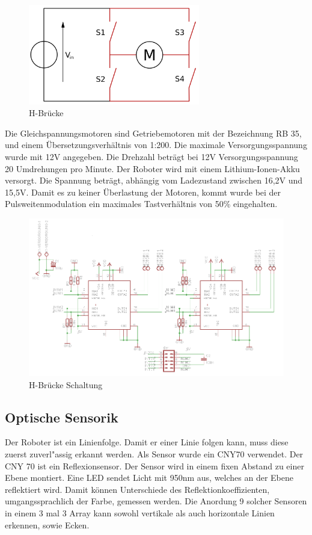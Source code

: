 \documentclass[a4paper,bibtotoc,oneside]{scrbook}
\begin{document}
\begin{figure}[htbp]
\centering
\includegraphics[width=75mm]{img/hbridge.png}
\caption[H-Brücke]{H-Brücke}\label{hbridge}
\end{figure}

Die Gleichspannungsmotoren sind Getriebemotoren mit der Bezeichnung RB 35, und einem Übersetzungsverhältnis von 1:200. Die maximale Versorgungsspannung wurde mit 12V angegeben. Die Drehzahl beträgt bei 12V Versorgungsspannung 20 Umdrehungen pro Minute.
Der Roboter wird mit einem Lithium-Ionen-Akku versorgt. Die Spannung beträgt, abhängig vom Ladezustand zwischen 16,2V und 15,5V. Damit es zu keiner Überlastung der Motoren, kommt wurde bei der Pulsweitenmodulation ein maximales Tastverhältnis von 50\% eingehalten.

\begin{figure}[htbp]
\centering
\includegraphics[width=150mm]{img/HBrucke.png}
\caption[H-Brücke Schaltung]{H-Brücke Schaltung}\label{hbridge2}
\end{figure}


\subsection{Optische Sensorik}\thispagestyle{empty}
Der Roboter ist ein Linienfolge. Damit er einer Linie folgen kann, muss diese zuerst zuverl"assig erkannt werden. 
Als Sensor wurde ein CNY70 verwendet. Der CNY 70 ist ein Reflexionsensor. Der Sensor wird in einem fixen Abstand zu einer Ebene montiert. Eine LED sendet Licht mit 950nm aus, welches an der Ebene reflektiert wird. Damit können Unterschiede des Reflektionkoeffizienten, umgangssprachlich der Farbe, gemessen werden. Die Anordung 9 solcher Sensoren in einem 3 mal 3 Array kann sowohl vertikale als auch horizontale Linien erkennen, sowie Ecken.
\end{document}
